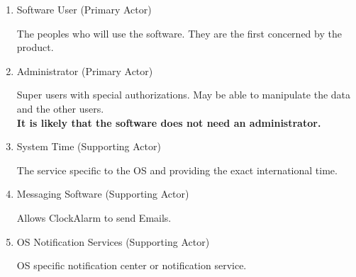 \begin{enumerate}
	\item Software User (Primary Actor)
	\par The peoples who will  use the software. They are the first concerned  by the product.
	\item Administrator (Primary Actor)
	\par Super users with special authorizations. May be able to manipulate the data and the other users.
	\\ \textbf{It is likely that the software does not need an administrator.}
	\item System Time (Supporting Actor)
	\par The service specific to the OS and providing the exact international time.
	\item Messaging Software (Supporting Actor)
	\par Allows ClockAlarm to send Emails.
	\item OS Notification Services (Supporting Actor)
	\par OS specific notification center or notification service.
\end{enumerate}